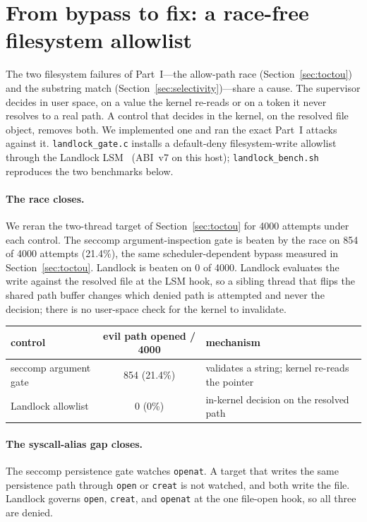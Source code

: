 \documentclass[11pt]{article}
\newcommand{\Nrace}{4000}
\newcommand{\RaceBench}{21.4}
\begin{document}
\section{From bypass to fix: a race-free filesystem allowlist}\label{sec:landlock}

The two filesystem failures of Part~I---the allow-path race (Section~\ref{sec:toctou}) and the substring
match (Section~\ref{sec:selectivity})---share a cause. The supervisor decides in user space, on a value
the kernel re-reads or on a token it never resolves to a real path. A control that decides in the kernel,
on the resolved file object, removes both. We implemented one and ran the exact Part~I attacks against it.
\texttt{landlock\_gate.c} installs a default-deny filesystem-write allowlist through the Landlock
LSM~\cite{landlock} (ABI~v7 on this host); \texttt{landlock\_bench.sh} reproduces the two benchmarks below.

\paragraph{The race closes.} We reran the two-thread target of Section~\ref{sec:toctou} for \Nrace{}
attempts under each control. The seccomp argument-inspection gate is beaten by the race on 854 of \Nrace{}
attempts (\RaceBench\%), the same scheduler-dependent bypass measured in Section~\ref{sec:toctou}. Landlock
is beaten on 0 of \Nrace{}. Landlock evaluates the write against the resolved file at the LSM hook, so a
sibling thread that flips the shared path buffer changes which denied path is attempted and never the
decision; there is no user-space check for the kernel to invalidate.

\begin{center}
\begin{tabular}{lcl}
\toprule
control & evil path opened / \Nrace{} & mechanism \\
\midrule
seccomp argument gate & 854 (\RaceBench\%) & validates a string; kernel re-reads the pointer \\
Landlock allowlist & 0 (0\%) & in-kernel decision on the resolved path \\
\bottomrule
\end{tabular}
\end{center}

\paragraph{The syscall-alias gap closes.} The seccomp persistence gate watches \texttt{openat}. A target
that writes the same persistence path through \texttt{open} or \texttt{creat} is not watched, and both
write the file. Landlock governs \texttt{open}, \texttt{creat}, and \texttt{openat} at the one file-open
hook, so all three are denied.
\end{document}
